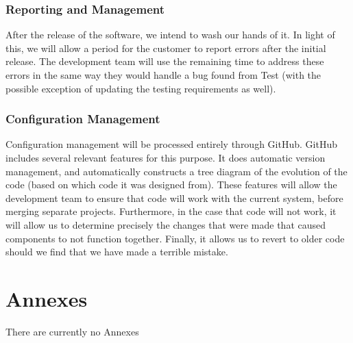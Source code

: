\documentclass{article}
\begin{document}
\subsubsection{Reporting and Management}
After the release of the software, we intend to wash our hands of it. In light of this, we will allow a period for the customer to report errors after the initial release. The development team will use the remaining time to address these errors in the same way they would handle a bug found from Test (with the possible exception of updating the testing requirements as well).
\subsubsection{Configuration Management}
Configuration management will be processed entirely through GitHub. GitHub includes several relevant features for this purpose. It does automatic version management, and automatically constructs a tree diagram of the evolution of the code (based on which code it was designed from). These features will allow the development team to ensure that code will work with the current system, before merging separate projects. Furthermore, in the case that code will not work, it will allow us to determine precisely the changes that were made that caused components to not function together. Finally, it allows us to revert to older code should we find that we have made a terrible mistake.
\section{Annexes}
There are currently no Annexes
\end{document}
